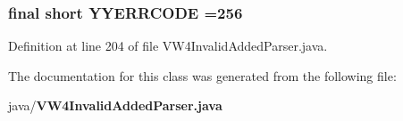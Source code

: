\subsubsection[{Y\+Y\+E\+R\+R\+C\+O\+D\+E}]{\setlength{\rightskip}{0pt plus 5cm}final short Y\+Y\+E\+R\+R\+C\+O\+D\+E =256\hspace{0.3cm}{\ttfamily [static]}}\label{classorg_1_1smallfoot_1_1parser_1_1zone_1_1VW4InvalidAddedParser_a1c58472ea6621d2f613831e08d10dba3}


Definition at line 204 of file V\+W4\+Invalid\+Added\+Parser.\+java.



The documentation for this class was generated from the following file\+:\begin{DoxyCompactItemize}
\item 
java/{\bf V\+W4\+Invalid\+Added\+Parser.\+java}\end{DoxyCompactItemize}
